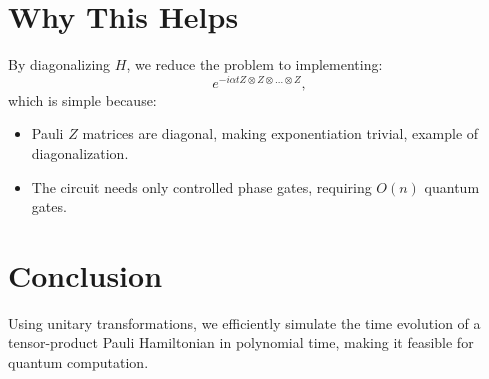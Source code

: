 \documentclass{article}
\begin{document}
\section{Why This Helps}
By diagonalizing $H$, we reduce the problem to implementing:
\begin{equation}
  e^{-i\alpha t Z \otimes Z \otimes \dots \otimes Z},
\end{equation}
which is simple because:
\begin{itemize}
\item Pauli $Z$ matrices are diagonal, making exponentiation trivial, example of diagonalization.
\item The circuit needs only controlled phase gates, requiring $O(n)$ quantum gates.
\end{itemize}

\section{Conclusion}
Using unitary transformations, we efficiently simulate the time evolution of a tensor-product Pauli Hamiltonian in polynomial time, making it feasible for quantum computation.
\end{document}
